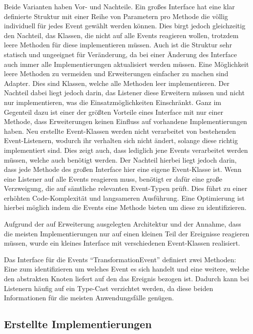 Beide Varianten haben Vor- und Nachteile.
Ein großes Interface hat eine klar definierte Struktur mit einer Reihe von Parametern pro Methode die völlig individuell für jedes Event gewählt werden können. Dies birgt jedoch gleichzeitig den Nachteil, das Klassen, die nicht auf alle Events reagieren wollen, trotzdem leere Methoden für diese implementieren müssen. Auch ist die Struktur sehr statisch und ungeeignet für Veränderung, da bei einer Änderung des Interface auch immer alle Implementierungen aktualisiert werden müssen. Eine Möglichkeit leere Methoden zu vermeiden und Erweiterungen einfacher zu machen sind Adapter. Dies sind Klassen, welche alle Methoden leer implementieren. Der Nachteil dabei liegt jedoch darin, das Listener diese Erweitern müssen und nicht nur implementieren, was die Einsatzmöglichkeiten Einschränkt.
Ganz im Gegenteil dazu ist einer der größten Vorteile eines Interface mit nur einer Methode, dass Erweiterungen keinen Einfluss auf vorhandene Implementierungen haben. Neu erstellte Event-Klassen werden nicht verarbeitet von bestehenden Event-Listenern, wodurch ihr verhalten sich nicht ändert, solange diese richtig implementiert sind. Dies zeigt auch, dass lediglich jene Events verarbeitet werden müssen, welche auch benötigt werden. Der Nachteil hierbei liegt jedoch darin, dass jede Methode des großen Interface hier eine eigene Event-Klasse ist. Wenn eine Listener auf alle Events reagieren muss, benötigt er dafür eine große Verzweigung, die auf sämtliche relevanten Event-Typen prüft. Dies führt zu einer erhöhten Code-Komplexität und langsameren Ausführung. Eine Optimierung ist hierbei möglich indem die Events eine Methode bieten um diese zu identifizieren.

Aufgrund der auf Erweiterung ausgelegten Architektur und der Annahme, dass die meisten Implementierungen nur auf einen kleinen Teil der Ereignisse reagieren müssen, wurde ein kleines Interface mit verschiedenen Event-Klassen realisiert.

Das Interface für die Events "`TransformationEvent"' definiert zwei Methoden: Eine zum identifizieren um welches Event es sich handelt und eine weitere, welche den abstrakten Knoten liefert auf den das Ereignis bezogen ist. Dadurch kann bei Listenern häufig auf ein Type-Cast verzichtet werden, da diese beiden Informationen für die meisten Anwendungsfälle genügen.

\subsection{Erstellte Implementierungen} 

